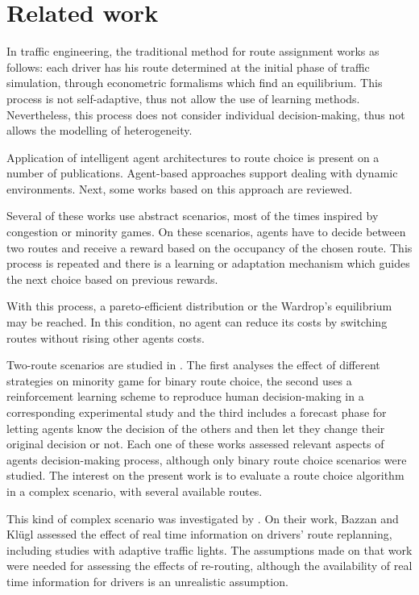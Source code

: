 \documentclass[12pt]{article}
\begin{document}
\section{Related work}
\label{sec:related}

In traffic engineering, the traditional method for route assignment works as follows: each driver has his route determined at the initial phase of traffic simulation, through econometric formalisms which find an equilibrium. This process is not self-adaptive, thus not allow the use of learning methods. Nevertheless, this process does not consider individual decision-making, thus not allows the modelling of heterogeneity.

Application of intelligent agent architectures to route choice is present on a number of publications. Agent-based approaches support dealing with dynamic environments. Next, some works based on this approach are reviewed.

Several of these works use abstract scenarios, most of the times inspired by congestion or minority games. On these scenarios, agents have to decide between two routes and receive a reward based on the occupancy of the chosen route. This process is repeated and there is a learning or adaptation mechanism which guides the next choice based on previous rewards.

With this process, a pareto-efficient distribution or the Wardrop's equilibrium \cite{Wardrop1952} may be reached. In this condition, no agent can reduce its costs by switching routes without rising other agents costs. 

Two-route scenarios are studied in \cite{Bazzan+2000icmas, Chmura&Pitz2007, Kluegl&Bazzan2004}. The first analyses the effect of different strategies on minority game for binary route choice, the second uses a reinforcement learning scheme to reproduce human decision-making in a corresponding experimental study and the third includes a forecast phase for letting agents know the decision of the others and then let they change their original decision or not. Each one of these works assessed relevant aspects of agents decision-making process, although only binary route choice scenarios were studied. The interest on the present work is to evaluate a route choice algorithm in a complex scenario, with several available routes.

This kind of complex scenario was investigated by \cite{Bazzan&Kluegl2008}. On their work, Bazzan and Kl\"ugl assessed the effect of real time information on drivers' route replanning, including studies with adaptive traffic lights. The assumptions made on that work were needed for assessing the effects of re-routing, although the availability of real time information for drivers is an unrealistic assumption.
\end{document}
